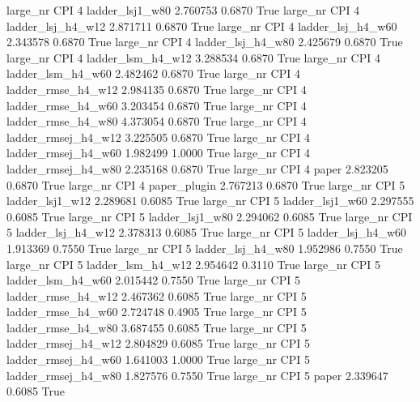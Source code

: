   large_nr      CPI                 4     ladder_lsj1_w80    2.760753      0.6870    True
  large_nr      CPI                 4   ladder_lsj_h4_w12    2.871711      0.6870    True
  large_nr      CPI                 4   ladder_lsj_h4_w60    2.343578      0.6870    True
  large_nr      CPI                 4   ladder_lsj_h4_w80    2.425679      0.6870    True
  large_nr      CPI                 4   ladder_lsm_h4_w12    3.288534      0.6870    True
  large_nr      CPI                 4   ladder_lsm_h4_w60    2.482462      0.6870    True
  large_nr      CPI                 4  ladder_rmse_h4_w12    2.984135      0.6870    True
  large_nr      CPI                 4  ladder_rmse_h4_w60    3.203454      0.6870    True
  large_nr      CPI                 4  ladder_rmse_h4_w80    4.373054      0.6870    True
  large_nr      CPI                 4 ladder_rmsej_h4_w12    3.225505      0.6870    True
  large_nr      CPI                 4 ladder_rmsej_h4_w60    1.982499      1.0000    True
  large_nr      CPI                 4 ladder_rmsej_h4_w80    2.235168      0.6870    True
  large_nr      CPI                 4               paper    2.823205      0.6870    True
  large_nr      CPI                 4        paper_plugin    2.767213      0.6870    True
  large_nr      CPI                 5     ladder_lsj1_w12    2.289681      0.6085    True
  large_nr      CPI                 5     ladder_lsj1_w60    2.297555      0.6085    True
  large_nr      CPI                 5     ladder_lsj1_w80    2.294062      0.6085    True
  large_nr      CPI                 5   ladder_lsj_h4_w12    2.378313      0.6085    True
  large_nr      CPI                 5   ladder_lsj_h4_w60    1.913369      0.7550    True
  large_nr      CPI                 5   ladder_lsj_h4_w80    1.952986      0.7550    True
  large_nr      CPI                 5   ladder_lsm_h4_w12    2.954642      0.3110    True
  large_nr      CPI                 5   ladder_lsm_h4_w60    2.015442      0.7550    True
  large_nr      CPI                 5  ladder_rmse_h4_w12    2.467362      0.6085    True
  large_nr      CPI                 5  ladder_rmse_h4_w60    2.724748      0.4905    True
  large_nr      CPI                 5  ladder_rmse_h4_w80    3.687455      0.6085    True
  large_nr      CPI                 5 ladder_rmsej_h4_w12    2.804829      0.6085    True
  large_nr      CPI                 5 ladder_rmsej_h4_w60    1.641003      1.0000    True
  large_nr      CPI                 5 ladder_rmsej_h4_w80    1.827576      0.7550    True
  large_nr      CPI                 5               paper    2.339647      0.6085    True
